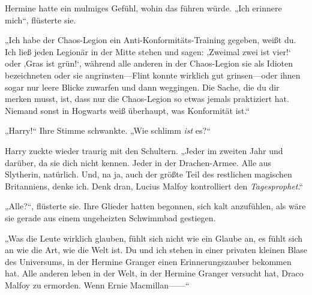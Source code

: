 Hermine hatte ein mulmiges Gefühl, wohin das führen würde.
„Ich erinnere mich“, flüsterte sie.

„Ich habe der Chaos-Legion ein Anti-Konformitäts-Training gegeben, weißt du. Ich ließ jeden Legionär in der Mitte stehen und sagen: ‚Zweimal zwei ist vier!‘ oder ‚Gras ist grün!‘, während alle anderen in der Chaos-Legion sie als Idioten bezeichneten oder sie angrinsten—Flint konnte wirklich gut grinsen—oder ihnen sogar nur leere Blicke zuwarfen und dann weggingen. Die Sache, die du dir merken musst, ist, dass nur die Chaos-Legion so etwas jemals praktiziert hat. Niemand sonst in Hogwarts weiß überhaupt, was Konformität ist.“

„Harry!“ Ihre Stimme schwankte. „Wie schlimm \emph{ist} es?“

Harry zuckte wieder traurig mit den Schultern. „Jeder im zweiten Jahr und darüber, da sie dich nicht kennen. Jeder in der Drachen-Armee. Alle aus Slytherin, natürlich. Und, na ja, auch der größte Teil des restlichen magischen Britanniens, denke ich. Denk dran, Lucius Malfoy kontrolliert den \emph{Tagesprophet}.“

„Alle?“, flüsterte sie. Ihre Glieder hatten begonnen, sich kalt anzufühlen, als wäre sie gerade aus einem ungeheizten Schwimmbad gestiegen.

„Was die Leute wirklich glauben, fühlt sich nicht wie ein Glaube an, es fühlt sich an wie die Art, wie die Welt ist. Du und ich stehen in einer privaten kleinen Blase des Universums, in der Hermine Granger einen Erinnerungszauber bekommen hat. Alle anderen leben in der Welt, in der Hermine Granger versucht hat, Draco Malfoy zu ermorden. Wenn Ernie Macmillan——“

